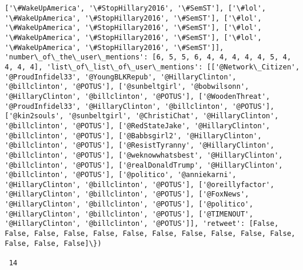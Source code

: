 \documentclass[11pt]{article}
\begin{document}
\begin{Verbatim}[commandchars=\\\{\}]
['\#WakeUpAmerica', '\#StopHillary2016', '\#SemST'], ['\#lol', '\#WakeUpAmerica', '\#StopHillary2016', '\#SemST'], ['\#lol', '\#WakeUpAmerica', '\#StopHillary2016', '\#SemST'], ['\#lol', '\#WakeUpAmerica', '\#StopHillary2016', '\#SemST'], ['\#lol', '\#WakeUpAmerica', '\#StopHillary2016', '\#SemST']], 'number\_of\_the\_user\_mentions': [6, 5, 5, 6, 4, 4, 4, 4, 4, 5, 4, 4, 4, 4], 'list\_of\_list\_of\_user\_mentions': [['@Network\_Citizen', '@ProudInfidel33', '@YoungBLKRepub', '@HillaryClinton', '@billclinton', '@POTUS'], ['@sunbeltgirl', '@bobwilsonn', '@HillaryClinton', '@billclinton', '@POTUS'], ['@WoodenThreat', '@ProudInfidel33', '@HillaryClinton', '@billclinton', '@POTUS'], ['@kin2souls', '@sunbeltgirl', '@ChristiChat', '@HillaryClinton', '@billclinton', '@POTUS'], ['@RedStateJake', '@HillaryClinton', '@billclinton', '@POTUS'], ['@Babbsgirl2', '@HillaryClinton', '@billclinton', '@POTUS'], ['@ResistTyranny', '@HillaryClinton', '@billclinton', '@POTUS'], ['@weknowwhatsbest', '@HillaryClinton', '@billclinton', '@POTUS'], ['@realDonaldTrump', '@HillaryClinton', '@billclinton', '@POTUS'], ['@politico', '@anniekarni', '@HillaryClinton', '@billclinton', '@POTUS'], ['@oreillyfactor', '@HillaryClinton', '@billclinton', '@POTUS'], ['@FoxNews', '@HillaryClinton', '@billclinton', '@POTUS'], ['@politico', '@HillaryClinton', '@billclinton', '@POTUS'], ['@TIMENOUT', '@HillaryClinton', '@billclinton', '@POTUS']], 'retweet': [False, False, False, False, False, False, False, False, False, False, False, False, False, False]\})

 14
 


\end{Verbatim}
\end{document}
